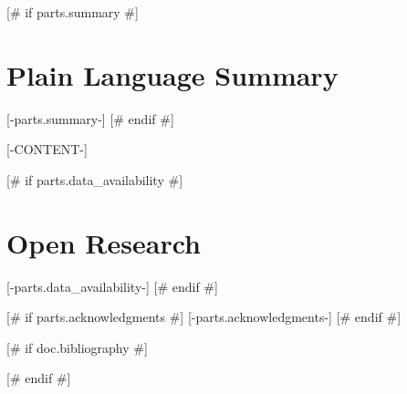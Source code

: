 \documentclass[draft]{agujournal2019}
[# else #]
\begin{document}
[# if parts.summary #]
\section*{Plain Language Summary}
[-parts.summary-]
[# endif #]

[-CONTENT-]




[# if parts.data_availability #]
\section*{Open Research}
[-parts.data_availability-]
[# endif #]



[# if parts.acknowledgments #]
\acknowledgments
[-parts.acknowledgments-]
[# endif #]


%
%
[# if doc.bibliography #]

[# endif #]

%
%
%
%
%
\end{document}
